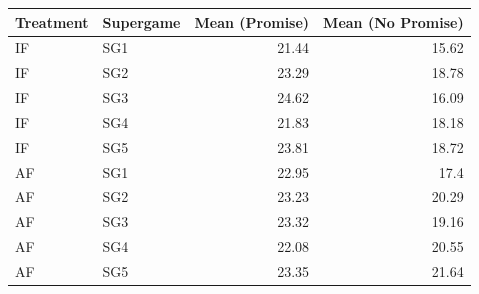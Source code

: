 \begin{tabular}{llrr}
  \toprule
  Treatment & Supergame & Mean (Promise) & Mean (No Promise) \\ 
  \midrule
  IF & SG1 & 21.44 & 15.62 \\ 
  IF & SG2 & 23.29 & 18.78 \\ 
  IF & SG3 & 24.62 & 16.09 \\ 
  IF & SG4 & 21.83 & 18.18 \\ 
  IF & SG5 & 23.81 & 18.72 \\ 
  AF & SG1 & 22.95 & 17.4 \\ 
  AF & SG2 & 23.23 & 20.29 \\ 
  AF & SG3 & 23.32 & 19.16 \\ 
  AF & SG4 & 22.08 & 20.55 \\ 
  AF & SG5 & 23.35 & 21.64 \\ 
  \bottomrule
\end{tabular}
